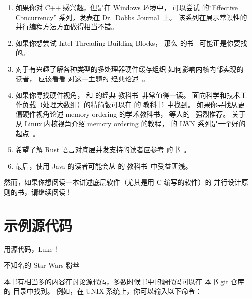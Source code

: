 \begin{enumerate}
	 的``C++ Concurrency in Action:
	Practical Multithreading''~\cite{AnthonyWilliams2012,AnthonyWilliams2019}
	或  的``Concurrency with Modern
	C++''~\cite{RainerGrimm2017C++Concurrency}。
\item	如果你对 C++ 感兴趣，但是在 Windows 环境中，
	可以尝试  的``Effective Concurrency''
	系列，发表在
	Dr.~Dobbs Journal~\cite{HerbSutter2008EffectiveConcurrency}上。
	该系列在展示常识性的并行编程方法方面做得相当不错。
\item	如果你想尝试 Intel Threading Building Blocks，
	那么  的书~\cite{Reinders2007Textbook}
	可能正是你要找的。
\item	对于有兴趣了解各种类型的多处理器硬件缓存组织
	如何影响内核内部实现的读者，
	应该看看  对这一主题的
	经典论述~\cite{Schimmel:1994:USM:175689}。
\item	如果你寻找硬件视角， 和
	 的经典
	教科书~\cite{Hennessy2026}非常值得一读。
	面向科学和技术工作负载（处理大数组）的精简版可以在
	 的
	教科书~\cite{AndrewChien2022ComputerArchitectureScientists}中找到。
	如果你寻找从更偏硬件视角论述 memory ordering 的学术教科书，
	 等人的~\cite{DanielJSorin2011MemModel,%
	VijayNagarajan2020MemModel}
	强烈推荐。
	关于从 Linux 内核视角介绍 memory ordering 的教程，
	 的 LWN 系列是一个好的起点~\cite{PaoloBonzini2021lockless1,PaoloBonzini2021lockless2,PaoloBonzini2021lockless3,PaoloBonzini2021lockless4,PaoloBonzini2021lockless5,PaoloBonzini2021lockless6}。
\item	希望了解 Rust 语言对底层并发支持的读者应参考
	 的书~\cite{MaraBos2023RustAtomicsAndLocks}。
\item	最后，使用 Java 的读者可能会从  的
	教科书~\cite{DougLea1997Textbook,Goetz2007Textbook}中受益匪浅。
\end{enumerate}

然而，如果你想阅读一本讲述底层软件（尤其是用 C 编写的软件）的
并行设计原则的书，请继续阅读！

\section{示例源代码}
\label{sec:howto:Sample Source Code}
%
\epigraph{用源代码，Luke！}{不知名的 Star Wars 粉丝}

本书有相当多的内容在讨论源代码，多数时候书中的源代码可以在
本书 git 仓库的  目录中找到。
例如，在 UNIX 系统上，你可以输入以下命令：

